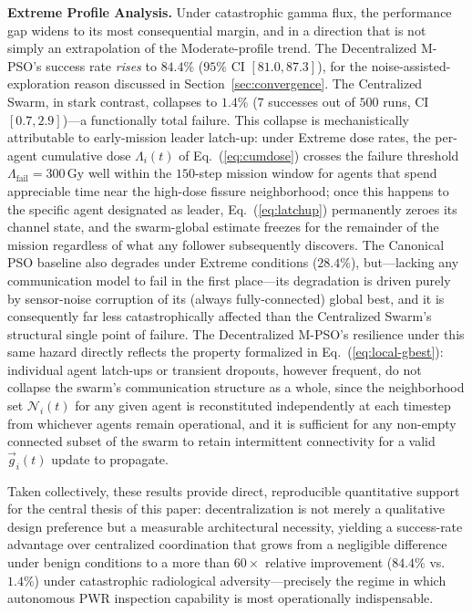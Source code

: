 \documentclass[journal]{IEEEtran}
\begin{document}
\textbf{Extreme Profile Analysis.} Under catastrophic gamma flux, the performance gap widens to its most consequential margin, and in a direction that is not simply an extrapolation of the Moderate-profile trend. The Decentralized M-PSO's success rate \emph{rises} to $84.4\%$ ($95\%$ CI $[81.0, 87.3]$), for the noise-assisted-exploration reason discussed in Section~\ref{sec:convergence}. The Centralized Swarm, in stark contrast, collapses to $1.4\%$ ($7$ successes out of $500$ runs, CI $[0.7, 2.9]$)---a functionally total failure. This collapse is mechanistically attributable to early-mission leader latch-up: under Extreme dose rates, the per-agent cumulative dose $\Lambda_i(t)$ of Eq.~(\ref{eq:cumdose}) crosses the failure threshold $\Lambda_{\text{fail}}=300\,\text{Gy}$ well within the $150$-step mission window for agents that spend appreciable time near the high-dose fissure neighborhood; once this happens to the specific agent designated as leader, Eq.~(\ref{eq:latchup}) permanently zeroes its channel state, and the swarm-global estimate freezes for the remainder of the mission regardless of what any follower subsequently discovers. The Canonical PSO baseline also degrades under Extreme conditions ($28.4\%$), but---lacking any communication model to fail in the first place---its degradation is driven purely by sensor-noise corruption of its (always fully-connected) global best, and it is consequently far less catastrophically affected than the Centralized Swarm's structural single point of failure. The Decentralized M-PSO's resilience under this same hazard directly reflects the property formalized in Eq.~(\ref{eq:local-gbest}): individual agent latch-ups or transient dropouts, however frequent, do not collapse the swarm's communication structure as a whole, since the neighborhood set $\mathcal{N}_i(t)$ for any given agent is reconstituted independently at each timestep from whichever agents remain operational, and it is sufficient for any non-empty connected subset of the swarm to retain intermittent connectivity for a valid $\vec{g}_i(t)$ update to propagate.

Taken collectively, these results provide direct, reproducible quantitative support for the central thesis of this paper: decentralization is not merely a qualitative design preference but a measurable architectural necessity, yielding a success-rate advantage over centralized coordination that grows from a negligible difference under benign conditions to a more than $60\times$ relative improvement ($84.4\%$ vs.\ $1.4\%$) under catastrophic radiological adversity---precisely the regime in which autonomous PWR inspection capability is most operationally indispensable.
\end{document}
